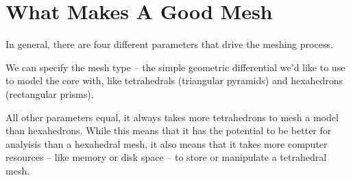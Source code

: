 \section{What Makes A Good Mesh}

In general, there are four different parameters that drive the meshing process.

We can specify the mesh type -- the simple geometric differential we'd like to use to model the core with, like tetrahedrals (triangular pyramids) and hexahedrons (rectangular prisms).

\begin{didyouknow}
All other parameters equal, it always takes more tetrahedrons to mesh a model than hexahedrons.  While this means that it has the potential to be better for analyisis than a hexahedral mesh, it also means that it takes more computer resources -- like memory or disk space -- to store or manipulate a tetrahedral mesh.
\end{didyouknow}


